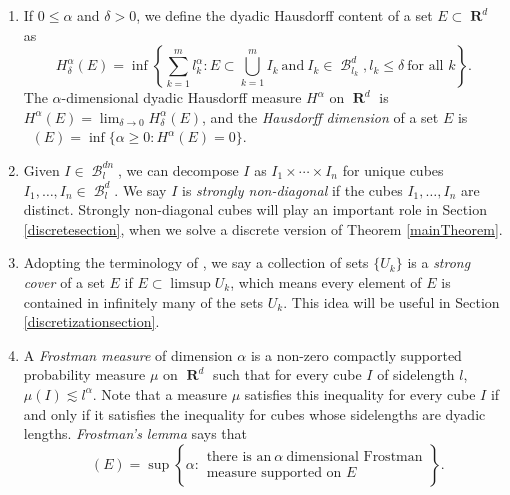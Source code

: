 \documentclass[dvipsnames,letterpaper,12pt]{article}
\numberwithin{equation}{section}
\theoremstyle{plain}
\DeclareMathOperator{\hausdim}{\dim_{\mathbf{H}}}
\DeclareMathOperator{\RR}{\mathbf{R}}
\DeclareMathOperator{\B}{\mathcal{B}}
\begin{document}
\begin{enumerate}
	\item If $0 \leq \alpha$ and $\delta > 0$, we define the dyadic Hausdorff content of a set $E\subset\RR^d$ as 
	\[ H^\alpha_\delta(E) = \inf \left\{ \sum_{k = 1}^m l_k^\alpha : E \subset \bigcup_{k = 1}^m I_k\ \text{and}\ I_k \in \B^d_{l_k}, l_k \leq \delta\ \text{for all $k$} \right\}. \]
	The $\alpha$-dimensional dyadic Hausdorff measure $H^\alpha$ on $\RR^d$ is $H^\alpha(E) = \lim_{\delta \to 0} H_\delta^\alpha(E)$, and the {\it Hausdorff dimension} of a set $E$ is $\hausdim(E) = \inf \{ \alpha \geq 0 : H^\alpha(E) = 0 \}$.
%
%
	\item \label{stronglyNonDiagonalDef}Given $I \in \B^{dn}_l$, we can decompose $I$ as $I_1 \times \cdots \times I_n$ for unique cubes $I_1, \dots, I_n \in \B_l^d$. We say $I$ is {\it strongly non-diagonal} if the cubes $I_1, \dots, I_n$ are distinct. Strongly non-diagonal cubes will play an important role in Section \ref{discretesection}, when we solve a discrete version of Theorem \ref{mainTheorem}.
%
%
	\item\label{strongCoverDefn} Adopting the terminology of \cite{KatzTao}, we say a collection of sets $\{ U_k \}$ is a {\it strong cover} of a set $E$ if $E \subset \limsup U_k$, which means every element of $E$ is contained in infinitely many of the sets $U_k$. This idea will be useful in Section \ref{discretizationsection}.  
%
%
	\item\label{frostmanItem} A {\it Frostman measure} of dimension $\alpha$ is a non-zero compactly supported probability measure $\mu$ on $\RR^d$ such that for every cube $I$ of sidelength $l$, $\mu(I) \lesssim l^\alpha$. Note that a measure $\mu$ satisfies this inequality for every cube $I$ if and only if it satisfies the inequality for cubes whose sidelengths are dyadic lengths. {\it Frostman's lemma} says that
	\[ \hausdim(E) = \sup \left\{ \alpha: \begin{array}{c} \text{there is an}\ \alpha\ \text{dimensional Frostman}\\
	\text{measure supported on $E$} \end{array} \right\}. \]
\end{enumerate}
\end{document}
